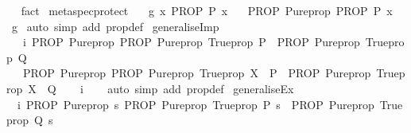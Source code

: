 \begin{isabellebody}
\isadelimproof
\ %
\endisadelimproof
%
\isatagproof
{}\isamarkupfalse%
\ fact%
\endisatagproof
{\isafoldproof}%
%
\isadelimproof
%
\endisadelimproof
\isanewline
\isanewline
{}\isamarkupfalse%
\ meta{\isacharunderscore}spec{\isacharunderscore}protect{\isacharcolon}\isanewline
\ \ \ g{\isacharcolon}\ {\isachardoublequoteopen}{\isasymAnd}x{\isachardot}\ PROP\ P\ x{\isachardoublequoteclose}\isanewline
\ \ \ {\isachardoublequoteopen}PROP\ Pure{\isachardot}prop\ {\isacharparenleft}PROP\ P\ x{\isacharparenright}{\isachardoublequoteclose}\isanewline
%
\isadelimproof
%
\endisadelimproof
%
\isatagproof
{}\isamarkupfalse%
\ g\isanewline
{}\isamarkupfalse%
\ {\isacharparenleft}auto\ simp\ add{\isacharcolon}\ prop{\isacharunderscore}def{\isacharparenright}%
\endisatagproof
{\isafoldproof}%
%
\isadelimproof
\isanewline
%
\endisadelimproof
\isanewline
{}\isamarkupfalse%
\ generaliseImp{\isacharcolon}\ \isanewline
\ \ \ i{\isacharcolon}\ {\isachardoublequoteopen}PROP\ Pure{\isachardot}prop\ {\isacharparenleft}PROP\ Pure{\isachardot}prop\ {\isacharparenleft}Trueprop\ P{\isacharparenright}\ {\isasymLongrightarrow}\ PROP\ Pure{\isachardot}prop\ {\isacharparenleft}Trueprop\ Q{\isacharparenright}{\isacharparenright}{\isachardoublequoteclose}\isanewline
\ \ \ {\isachardoublequoteopen}PROP\ Pure{\isachardot}prop\ {\isacharparenleft}PROP\ Pure{\isachardot}prop\ {\isacharparenleft}Trueprop\ {\isacharparenleft}X\ {\isasymlongrightarrow}\ P{\isacharparenright}{\isacharparenright}\ {\isasymLongrightarrow}\ PROP\ Pure{\isachardot}prop\ {\isacharparenleft}Trueprop\ {\isacharparenleft}X\ {\isasymlongrightarrow}\ Q{\isacharparenright}{\isacharparenright}{\isacharparenright}{\isachardoublequoteclose}\isanewline
%
\isadelimproof
\ \ %
\endisadelimproof
%
\isatagproof
{}\isamarkupfalse%
\ i\isanewline
\ \ \isamarkupfalse%
\ {\isacharparenleft}auto\ simp\ add{\isacharcolon}\ prop{\isacharunderscore}def{\isacharparenright}%
\endisatagproof
{\isafoldproof}%
%
\isadelimproof
\isanewline
%
\endisadelimproof
\isanewline
{}\isamarkupfalse%
\ generaliseEx{\isacharcolon}\ \isanewline
\ \ i{\isacharcolon}\ {\isachardoublequoteopen}PROP\ Pure{\isachardot}prop\ {\isacharparenleft}{\isasymAnd}s{\isachardot}\ PROP\ Pure{\isachardot}prop\ {\isacharparenleft}Trueprop\ {\isacharparenleft}P\ s{\isacharparenright}{\isacharparenright}\ {\isasymLongrightarrow}\ PROP\ Pure{\isachardot}prop\ {\isacharparenleft}Trueprop\ {\isacharparenleft}Q\ s{\isacharparenright}{\isacharparenright}{\isacharparenright}{\isachardoublequoteclose}\ \isanewline

\end{isabellebody}

